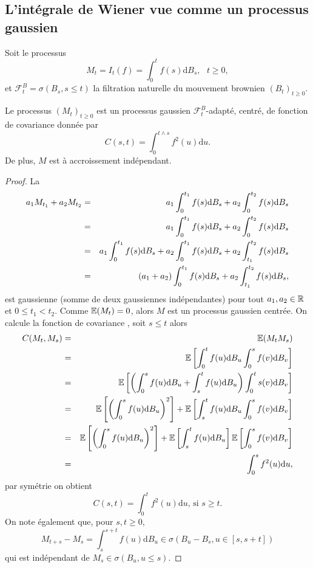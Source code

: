 \subsection{L'intégrale de Wiener vue comme un processus gaussien}
Soit le processus 
$$
M_t =I_t(f)= \int_{0}^t f(s)\text{d}B_s,\text{ }t\geq 0,
$$
et $\mathcal{F}_t^B = \sigma(B_s,s\leq t)$ la filtration naturelle du mouvement brownien $(B_t)_{t\geq 0}$.
\begin{theo}
Le processus $(M_t)_{t\geq 0}$ est un processus gaussien $\mathcal{F}_t^B$-adapté, centré, de fonction de covariance donnée par 
$$
C(s,t) = \int_0^{t\land s}f^2(u)\text{d}u. 
$$
De plus, $M$ est à accroissement indépendant.
\end{theo}
\begin{proof}
La \va
\begin{eqnarray*}
a_1M_{t_1} + a_2M_{t_2}& =& a_1\int_0^{t_1}f(s)\text{d} B_s + a_2\int_0^{t_2}f(s)\text{d} B_s\\
& =& a_1\int_0^{t_1}f(s)\text{d} B_s + a_2\int_0^{t_2}f(s)\text{d} B_s\\
& =& a_1\int_0^{t_1}f(s)\text{d} B_s + a_2\int_0^{t_1}f(s)\text{d} B_s + a_2\int_{t_1}^{t_2}f(s)\text{d} B_s\\
& =& (a_1+a_2)\int_0^{t_1}f(s)\text{d} B_s +   a_2\int_{t_1}^{t_2}f(s)\text{d} B_s,
\end{eqnarray*}
est gaussienne (somme de deux gaussiennes indépendantes) pour tout $a_1, a_2\in \mathbb{R}$ et $0\leq t_1<t_2$. Comme $\mathbb{E}(M_t)=0$, alors $M$ est un processus gaussien centrée. On calcule la fonction de covariance , soit $s\leq t$ alors
\begin{eqnarray*}
C(M_t, M_s)&=&\mathbb{E}(M_tM_s)\\
&=&\mathbb{E}\left[\int_0^tf(u)\text{d}B_u\int_0^sf(v)\text{d}B_v\right]\\
&=&\mathbb{E}\left[\left(\int_0^sf(u)\text{d}B_u+ \int_s^tf(u)\text{d}B_u\right) \int_0^ts(v)\text{d}B_v\right]\\
&=&\mathbb{E}\left[\left(\int_0^sf(u)\text{d}B_u\right)^2\right]+\mathbb{E}\left[\int_s^tf(u)\text{d}B_u\int_0^sf(v)\text{d}B_v\right]\\
&=&\mathbb{E}\left[\left(\int_0^sf(u)\text{d}B_u\right)^2\right]+\mathbb{E}\left[\int_s^tf(u)\text{d}B_u\right]\mathbb{E}\left[\int_0^sf(v)\text{d}B_v\right]\\
&=&\int_0^sf^2(u)\text{d}u,
\end{eqnarray*}
par symétrie on obtient 
$$
C(s,t) =\int_0^tf^2(u)\text{d}u \text{, si }s\geq t.
$$
On note également que, pour $s, t\geq 0$,
$$
M_{t+s}-M_s = \int_{s}^{s+t}f(u)\text{d}B_u\in\sigma(B_u - B_s, u\in[s, s+t])
$$
qui est indépendant de $M_s\in\sigma(B_u, u\leq s)$.
\end{proof}

